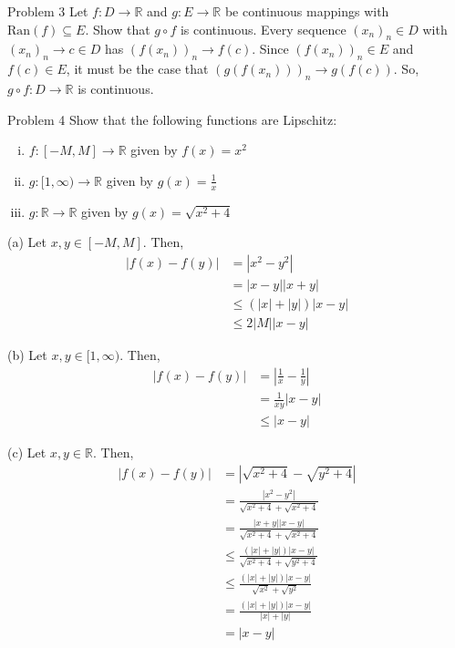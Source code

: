 \documentclass[10pt]{extarticle}
\newcommand{\ran}{\text{Ran}}
\newcommand{\R}{\mathbb{R}}
\begin{document}
  \begin{problem}{Problem 3}
    Let $f: D\rightarrow \R$ and $g: E\rightarrow \R$ be continuous mappings with $\ran(f)\subseteq E$. Show that $g\circ f$ is continuous.
    \tcblower
    Every sequence $(x_n)_n\in D$ with $(x_n)_n \rightarrow c\in D$ has $(f(x_n))_n \rightarrow f(c)$. Since $(f(x_n))_n \in E$ and $f(c)\in E$, it must be the case that $(g(f(x_n)))_n \rightarrow g(f(c))$. So, $g\circ f: D\rightarrow \R$ is continuous.
  \end{problem}
  \begin{problem}{Problem 4}
    Show that the following functions are Lipschitz:
    \begin{enumerate}[(i)]
      \item $f: [-M,M] \rightarrow \R$ given by $f(x) = x^2$
      \item $g: [1,\infty)\rightarrow \R$ given by $g(x) = \frac{1}{x}$
      \item $g: \R \rightarrow \R$ given by $g(x) = \sqrt{x^2 + 4}$
    \end{enumerate}
    \tcblower
    \begin{problem}{(a)}
      Let $x,y\in [-M,M]$. Then,
      \begin{align*}
        |f(x) - f(y)| &= |x^2 - y^2|\\
                      &= |x-y||x+y|\\
                      &\leq \left(|x| + |y|\right)|x-y|\\
                      &\leq 2|M||x-y|
      \end{align*}
    \end{problem}
    \begin{problem}{(b)}
      Let $x,y\in [1,\infty)$. Then,
      \begin{align*}
        |f(x) - f(y)| &= \left|\frac{1}{x} - \frac{1}{y}\right|\\
                      &= \frac{1}{xy}|x-y|\\
                      &\leq |x-y|
      \end{align*}
    \end{problem}
    \begin{problem}{(c)}
      Let $x,y\in \R$. Then,
      \begin{align*}
        |f(x) - f(y)| &= |\sqrt{x^2 + 4} - \sqrt{y^2 + 4}|\\
                      &= \frac{|x^2 - y^2|}{\sqrt{x^2 + 4} + \sqrt{x^2 + 4}}\\
                      &= \frac{|x+y||x-y|}{\sqrt{x^2 + 4} + \sqrt{x^2 + 4}}\\
                      &\leq \frac{(|x| + |y|)|x-y|}{\sqrt{x^2+4} + \sqrt{y^2+4}}\\
                      &\leq \frac{(|x| + |y|)|x-y|}{\sqrt{x^2} + \sqrt{y^2}}\\
                      &= \frac{\left(|x| + |y|\right)|x-y|}{|x| + |y|} \\
                      &= |x-y|
      \end{align*}
    \end{problem}
  \end{problem}
\end{document}
